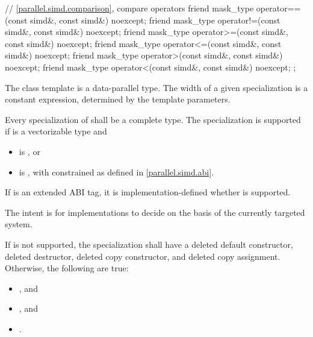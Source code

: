 \begin{codeblock}
{  // \ref{parallel.simd.comparison},  compare operators
  friend mask_type operator==(const simd&, const simd&) noexcept;
  friend mask_type operator!=(const simd&, const simd&) noexcept;
  friend mask_type operator>=(const simd&, const simd&) noexcept;
  friend mask_type operator<=(const simd&, const simd&) noexcept;
  friend mask_type operator>(const simd&, const simd&) noexcept;
  friend mask_type operator<(const simd&, const simd&) noexcept;
};
\end{codeblock}

\pnum
The class template  is a data-parallel type. The width of a given  specialization is a constant expression, determined by the template parameters.

\pnum
Every specialization of  shall be a complete type. The specialization  is supported if  is a vectorizable type and
\begin{itemize}
  \item {} is , or
  \item {} is , with  constrained as defined in \ref{parallel.simd.abi}.
\end{itemize}

If  is an extended ABI tag, it is implementation-defined whether  is supported. \begin{note}The intent is for implementations to decide on the basis of the currently targeted system.\end{note}

If  is not supported, the specialization shall have a deleted default constructor, deleted destructor, deleted copy constructor, and deleted copy assignment.
Otherwise, the following are true:
\begin{itemize}
  \item {}, and
  \item {}, and
  \item {}.
\end{itemize}

